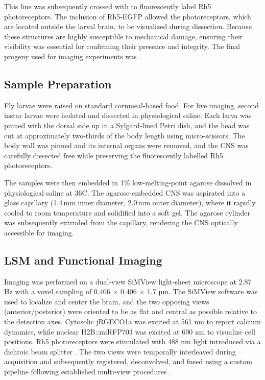     This line was subsequently crossed with  to fluorescently label Rh5 photoreceptors. The inclusion of Rh5-EGFP allowed the photoreceptors, which are located outside the larval brain, to be visualized during dissection. Because these structures are highly susceptible to mechanical damage, ensuring their visibility was essential for confirming their presence and integrity. The final progeny used for imaging experiments was .


    \subsection{Sample Preparation}
    Fly larvae were raised on standard cornmeal-based food.
    For live imaging, second instar larvae were isolated and dissected in physiological saline. Each larva was pinned with the dorsal side up in a Sylgard-lined Petri dish, and the head was cut at approximately two-thirds of the body length using micro-scissors. The body wall was pinned and its internal organs were removed, and the CNS was carefully dissected free while preserving the fluorescently labelled Rh5 photoreceptors.

    The samples were then embedded in 1\% low-melting-point agarose dissolved in physiological saline at 36\degree C. The agarose-embedded CNS was aspirated into a glass capillary (1.4\,mm inner diameter, 2.0\,mm outer diameter), where it rapidly cooled to room temperature and solidified into a soft gel. The agarose cylinder was subsequently extruded from the capillary, rendering the CNS optically accessible for imaging.


    \subsection{LSM and Functional Imaging}
    Imaging was performed on a dual‑view SiMView light‑sheet microscope at 2.87 Hz with a voxel sampling of 0.406 × 0.406 × 1.7 µm. The SiMView software was used to localize and center the brain, and the two opposing views (anterior/posterior) were oriented to be as flat and central as possible relative to the detection axes.
    Cytosolic jRGECO1a was excited at 561 nm to report calcium dynamics, while nuclear H2B::miRFP703 was excited at 690 nm to visualize cell positions. Rh5 photoreceptors were stimulated with 488 nm light introduced via a dichroic beam splitter \citep{randel2025combining}. The two views were temporally interleaved during acquisition and subsequently registered, deconvolved, and fused using a custom pipeline following established multi‑view procedures \citep{lemon2015whole, tomer2012quantitative}.


